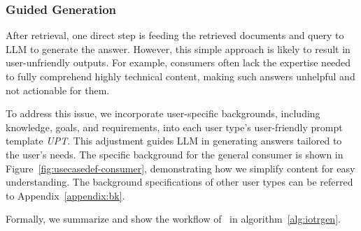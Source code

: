 


\subsubsection{Guided Generation}\label{sec:resgen}

After retrieval, one direct step is feeding the retrieved documents and query to LLM to generate the answer. 
However, this simple approach is likely to result in user-unfriendly outputs. 
For example, consumers often lack the expertise needed to fully comprehend highly technical content, making such answers unhelpful and not actionable for them.

To address this issue, we incorporate user-specific backgrounds, including knowledge, goals, and requirements, into each user type's user-friendly prompt template \textit{UPT}. This adjustment guides LLM in generating answers tailored to the user's needs.
The specific background for the general consumer is shown in Figure~\ref{fig:usecasedef-consumer}, demonstrating how we simplify content for easy understanding. The background specifications of other user types can be referred to Appendix~\ref{appendix:bk}.




Formally, we summarize and show the workflow of \iotrgen\ in algorithm~\ref{alg:iotrgen}.

